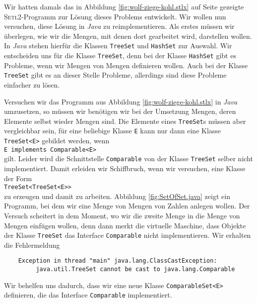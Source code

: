 \noindent
Wir hatten damals das in Abbildung
\ref{fig:wolf-ziege-kohl.stlx} auf Seite \pageref{fig:wolf-ziege-kohl.stlx} gezeigte
\textsc{Setl2}-Programm zur L\"osung dieses Problems entwickelt.  
Wir wollen nun versuchen, diese L\"osung in  \textsl{Java} zu reimplementieren.
Als erstes m\"ussen wir \"uberlegen, wie wir die Mengen, mit denen dort gearbeitet wird,
darstellen wollen.    In \textsl{Java} stehen hierf\"ur die Klassen \texttt{TreeSet}
und \texttt{HashSet} zur Auswahl.  
Wir entscheiden uns f\"ur die Klasse \texttt{TreeSet}, denn bei der Klasse \texttt{HashSet}
gibt es Probleme, wenn wir Mengen von Mengen definieren wollen.
Auch bei der Klasse \texttt{TreeSet} gibt es an dieser Stelle Probleme, allerdings sind
diese Probleme einfacher zu l\"osen.

Versuchen wir
das Programm aus Abbildung \ref{fig:wolf-ziege-kohl.stlx} in \textsl{Java} umzusetzen,
so m\"ussen wir  ben\"otigen wir bei  der Umsetzung Mengen,
deren Elemente selbst wieder Mengen sind.  Die Elemente eines \texttt{TreeSet}s m\"ussen
aber vergleichbar sein, f\"ur eine beliebige Klasse \texttt{E} kann nur dann eine Klasse
\texttt{TreeSet<E>} gebildet werden, wenn 
\\[0.2cm]
\hspace*{1.3cm}
\texttt{E implements Comparable<E>}
\\[0.2cm]
gilt.  Leider wird die Schnittstelle \texttt{Comparable} von der Klasse
\texttt{TreeSet} selber nicht implementiert.  Damit erleiden wir Schiffbruch, wenn wir
versuchen,  eine Klasse der Form 
\\[0.2cm]
\hspace*{1.3cm}
\texttt{TreeSet<TreeSet<E>>}
\\[0.2cm]
zu erzeugen und damit zu arbeiten.  Abbildung \ref{fig:SetOfSet.java} zeigt ein Programm,
bei dem wir eine Menge von Mengen von Zahlen anlegen wollen.  Der Versuch scheitert in dem
Moment, wo wir die zweite Menge in die Menge von Mengen einf\"ugen wollen, denn dann merkt
die virtuelle Maschine, dass Objekte der Klasse \texttt{TreeSet} das Interface
\texttt{Comparable} nicht implementieren.  Wir erhalten die Fehlermeldung
\begin{verbatim}
    Exception in thread "main" java.lang.ClassCastException: 
         java.util.TreeSet cannot be cast to java.lang.Comparable
\end{verbatim}
Wir behelfen uns dadurch, dass wir eine neue Klasse \texttt{ComparableSet<E>}
definieren, die das Interface \texttt{Comparable} implementiert.


